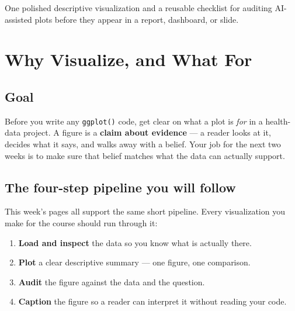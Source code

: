 \documentclass[
  letterpaper,
  DIV=11,
  numbers=noendperiod,
  oneside]{scrreprt}
\providecommand{\tightlist}{%
  \setlength{\itemsep}{0pt}\setlength{\parskip}{0pt}}
\begin{document}

One polished descriptive visualization and a reusable checklist for
auditing AI-assisted plots before they appear in a report, dashboard, or
slide.

\chapter*{Why Visualize, and What For}\label{why-visualize-and-what-for}


\section*{Goal}\label{goal-1}


Before you write any \texttt{ggplot()} code, get clear on what a plot is
\emph{for} in a health-data project. A figure is a \textbf{claim about
evidence} --- a reader looks at it, decides what it says, and walks away
with a belief. Your job for the next two weeks is to make sure that
belief matches what the data can actually support.

\section*{The four-step pipeline you will
follow}\label{the-four-step-pipeline-you-will-follow}


This week's pages all support the same short pipeline. Every
visualization you make for the course should run through it:

\begin{enumerate}
\def\labelenumi{\arabic{enumi}.}
\tightlist
\item
  \textbf{Load and inspect} the data so you know what is actually there.
\item
  \textbf{Plot} a clear descriptive summary --- one figure, one
  comparison.
\item
  \textbf{Audit} the figure against the data and the question.
\item
  \textbf{Caption} the figure so a reader can interpret it without
  reading your code.
\end{enumerate}
\end{document}
